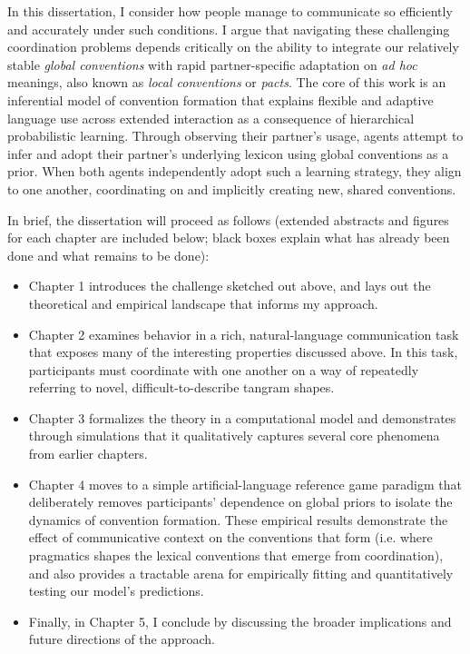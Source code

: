 \documentclass[12pt, donotrepeattitle, man, floatsintext]{apa6}
\begin{document}
In this dissertation, I consider how people manage to communicate so efficiently and accurately under such conditions. I argue that navigating these challenging coordination problems depends critically on the ability to integrate our relatively stable \emph{global conventions} with rapid partner-specific adaptation on \emph{ad hoc} meanings, also known as \emph{local conventions} or \emph{pacts}. The core of this work is an inferential model of convention formation that explains flexible and adaptive language use across extended interaction as a consequence of hierarchical probabilistic learning. Through observing their partner's usage, agents attempt to infer and adopt their partner's underlying lexicon using global conventions as a prior. When both agents independently adopt such a learning strategy, they align to one another, coordinating on and implicitly creating new, shared conventions. 

In brief, the dissertation will proceed as follows (extended abstracts and figures for each chapter are included below; black boxes explain what has already been done and what remains to be done): 
\begin{itemize}
\item Chapter 1 introduces the challenge sketched out above, and lays out the theoretical and empirical landscape that informs my approach.
\item Chapter 2 examines behavior in a rich, natural-language communication task that exposes many of the interesting properties discussed above. In this task, participants must coordinate with one another on a way of repeatedly referring to novel, difficult-to-describe tangram shapes. 
\item Chapter 3 formalizes the theory in a computational model and demonstrates through simulations that it qualitatively captures several core phenomena from earlier chapters.
\item Chapter 4 moves to a simple artificial-language reference game paradigm that deliberately removes participants' dependence on global priors to isolate the dynamics of convention formation. These empirical results demonstrate the effect of communicative context on the conventions that form (i.e. where pragmatics shapes the lexical conventions that emerge from coordination), and also provides a tractable arena for empirically fitting and quantitatively testing our model's predictions.
\item Finally, in Chapter 5, I conclude by discussing the broader implications and future directions of the approach.
\end{itemize}
\end{document}

